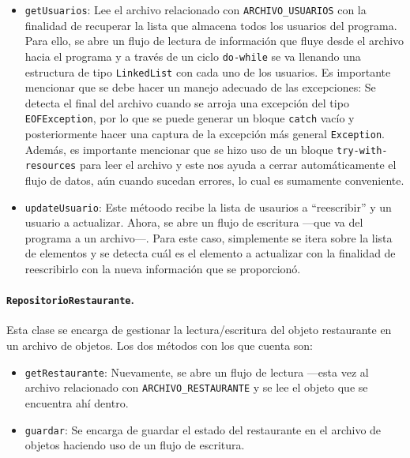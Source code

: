 \begin{itemize}
  \item \texttt{getUsuarios}: Lee el archivo relacionado con \texttt{ARCHIVO\_USUARIOS} con la finalidad
    de recuperar la lista que almacena todos los usuarios del programa. Para ello, se abre un flujo de 
    lectura de información que fluye desde el archivo hacia el programa y a través de un ciclo 
    \texttt{do-while} se va llenando una estructura de tipo \texttt{LinkedList} con cada uno de los 
    usuarios. Es importante mencionar que se debe hacer un manejo adecuado de las excepciones: Se detecta 
    el final del archivo cuando se arroja una excepción del tipo \texttt{EOFException}, por lo que se puede 
    generar un bloque \texttt{catch} vacío y posteriormente hacer una captura de la excepción más general
    \texttt{Exception}. Además, es importante mencionar que se hizo uso de un bloque 
    \texttt{try-with-resources} para leer el archivo y este nos ayuda a cerrar automáticamente el flujo de
    datos, aún cuando sucedan errores, lo cual es sumamente conveniente.
  \item \texttt{updateUsuario}: Este métoodo recibe la lista de usaurios a ``reescribir'' y un usuario a 
    actualizar. Ahora, se abre un flujo de escritura ---que va del programa a un archivo---. Para este caso, 
    simplemente se itera sobre la lista de elementos y se detecta cuál es el elemento a actualizar con la 
    finalidad de reescribirlo con la nueva información que se proporcionó.
\end{itemize}

\paragraph{\texttt{RepositorioRestaurante}.} Esta clase se encarga de gestionar la lectura/escritura del 
objeto restaurante en un archivo de objetos. Los dos métodos con los que cuenta son:

\begin{itemize}
  \item \texttt{getRestaurante}: Nuevamente, se abre un flujo de lectura ---esta vez al archivo relacionado 
    con \texttt{ARCHIVO\_RESTAURANTE} y se lee el objeto que se encuentra ahí dentro.
  \item \texttt{guardar}: Se encarga de guardar el estado del restaurante en el archivo de objetos haciendo 
    uso de un flujo de escritura.
\end{itemize}

\pagebreak
